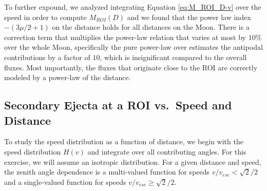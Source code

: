\documentclass{hitec}
\numberwithin{equation}{section}
\begin{document}
To further expound, we analyzed integrating Equation \eqref{eq:M_ROI_D-v} over the speed in order to compute $M_{ROI}(D)$ and we found that the power law index $-(3\mu/2+1)$ on the distance holds for all distances on the Moon. There is a correction term that multiplies the power-law relation that varies at most by $10\%$ over the whole Moon, specifically the pure power-law over estimates the antipodal contributions by a factor of $10$, which is insignificant compared to the overall fluxes. Most importantly, the fluxes that originate close to the ROI are correctly modeled by a power-law of the distance.



\subsection{Secondary Ejecta at a ROI vs.\ Speed and Distance}
To study the speed distribution as a function of distance, we begin with the speed distribution $H(v)$ and integrate over all contributing angles. For this exercise, we will assume an isotropic distribution. For a given distance and speed, the zenith angle dependence is a multi-valued function for speeds $v/v_{esc} < \sqrt{2}/2$ and a single-valued function for speeds $v/v_{esc} \ge \sqrt{2}/2$.
\end{document}
